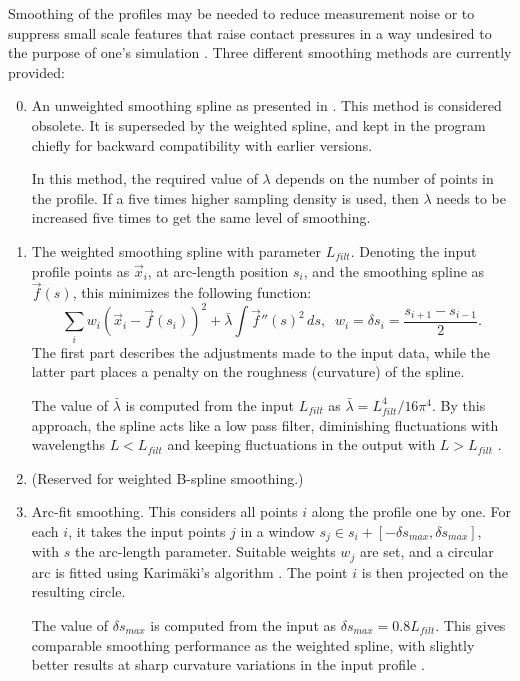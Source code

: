 \documentclass[12pt]{report}
\begin{document}
Smoothing of the profiles may be needed to reduce measurement noise or to
suppress small scale features that raise contact pressures in a way
undesired to the purpose of one's simulation \cite{Vollebregt2022b-cm2022}.
Three different smoothing methods are currently provided:
\begin{enumerate}\setcounter{enumi}{-1}
\item An unweighted smoothing spline as presented in
        \cite{Vollebregt2020b-wrgeom}. This method is considered obsolete.
        It is superseded by the weighted spline, and kept in the program 
        chiefly for backward compatibility with earlier versions. 

        In this method, the required value of $\lambda$ depends on the
        number of points in the profile. If a five times higher sampling
        density is used, then $\lambda$ needs to be increased five times
        to get the same level of smoothing.
\item The weighted smoothing spline with parameter $L_{filt}$. Denoting the
        input profile points as $\vec{x}_i$, at arc-length position $s_i$,
        and the smoothing spline as $\vec{f}(s)$, this minimizes the
        following function:
\begin{equation}
   \sum_i w_i \left( \vec{x}_i - \vec{f}(s_i) \right)^2 + 
                \bar{\lambda} \int \vec{f}''(s)^2 \, ds , \;\;
        w_i = \delta s_i = \frac{s_{i+1}-s_{i-1}}{2} .
\end{equation}
        The first part describes the adjustments made to the input data,
        while the latter part places a penalty on the roughness (curvature)
        of the spline. 

        The value of $\bar{\lambda}$ is computed from the input $L_{filt}$
        as $\bar{\lambda}=L_{filt}^4/16\pi^4$. By this approach, the spline
        acts like a low pass filter, diminishing fluctuations with
        wavelengths $L<L_{filt}$ and keeping fluctuations in the output
        with $L>L_{filt}$ \cite{Vollebregt2022b-cm2022}.
\item (Reserved for weighted B-spline smoothing.)
\item Arc-fit smoothing. This considers all points $i$ along the profile
        one by one. For each $i$, it takes the input points $j$ in a window
        $s_j\in s_i+[-\delta s_{max},\delta s_{max}]$, with $s$ the
        arc-length parameter. Suitable weights $w_j$ are set, and a
        circular arc is fitted using Karim\"aki's algorithm 
        \cite{Karimaki1991}. The point $i$ is then projected on the
        resulting circle.

        The value of $\delta s_{max}$ is computed from the input as $\delta
        s_{max}=0.8 L_{filt}$. This gives comparable smoothing performance
        as the weighted spline, with slightly better results at sharp
        curvature variations in the input profile \cite{Vollebregt2022b-cm2022}.
\end{enumerate}
\end{document}

